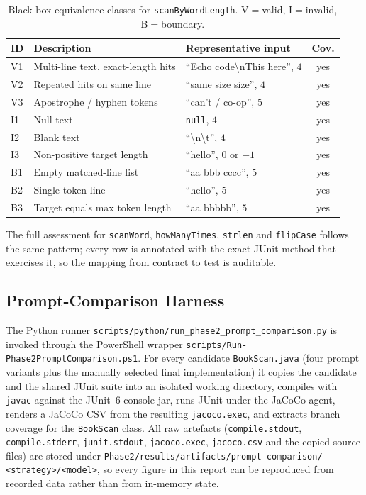 \documentclass[journal]{IEEEtran}
\begin{document}
\begin{table}[!t]
\renewcommand{\arraystretch}{1.15}
\caption{Black-box equivalence classes for \texttt{scanByWordLength}.
V$=$valid, I$=$invalid, B$=$boundary.}
\label{tab:bb-scanwordlength}
\centering
\footnotesize
\begin{tabular}{@{}lp{3.0cm}p{2.4cm}c@{}}
\toprule
\textbf{ID} & \textbf{Description} & \textbf{Representative input} & \textbf{Cov.} \\
\midrule
V1 & Multi-line text, exact-length hits & ``Echo code\textbackslash nThis here'', $4$ & yes \\
V2 & Repeated hits on same line        & ``same size size'', $4$           & yes \\
V3 & Apostrophe / hyphen tokens         & ``can't / co-op'', $5$            & yes \\
I1 & Null text                          & \texttt{null}, $4$                & yes \\
I2 & Blank text                         & ``\textbackslash n\textbackslash t'', $4$ & yes \\
I3 & Non-positive target length         & ``hello'', $0$ or $-1$            & yes \\
B1 & Empty matched-line list            & ``aa bbb cccc'', $5$              & yes \\
B2 & Single-token line                  & ``hello'', $5$                    & yes \\
B3 & Target equals max token length     & ``aa bbbbb'', $5$                 & yes \\
\bottomrule
\end{tabular}
\end{table}

The full assessment for \texttt{scanWord}, \texttt{howManyTimes},
\texttt{strlen} and \texttt{flipCase} follows the same pattern; every
row is annotated with the exact JUnit method that exercises it, so the
mapping from contract to test is auditable.

\subsection{Prompt-Comparison Harness}

The Python runner
\texttt{scripts/python/run\_phase2\_prompt\_comparison.py} is invoked
through the PowerShell wrapper
\texttt{scripts/Run-Phase2PromptComparison.ps1}. For every candidate
\texttt{BookScan.java} (four prompt variants plus the manually selected
final implementation) it copies the candidate and the shared JUnit suite
into an isolated working directory, compiles with \texttt{javac} against
the JUnit~6 console jar, runs JUnit under the JaCoCo agent, renders a
JaCoCo CSV from the resulting \texttt{jacoco.exec}, and extracts branch
coverage for the \texttt{BookScan} class. All raw artefacts
(\texttt{compile.stdout}, \texttt{compile.stderr}, \texttt{junit.stdout},
\texttt{jacoco.exec}, \texttt{jacoco.csv} and the copied source files)
are stored under
\texttt{Phase2/results/artifacts/prompt-comparison/}\,
\texttt{<strategy>/<model>}, so every figure in this report can be
reproduced from recorded data rather than from in-memory state.
\end{document}
